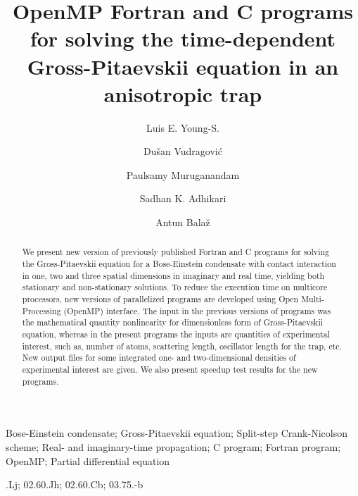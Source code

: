 \documentclass[onecolumn,3p]{elsarticle}
\begin{document}
\begin{frontmatter}

\title{OpenMP Fortran and C programs for solving the time-dependent Gross-Pitaevskii equation in an anisotropic trap}

\author[ift]{Luis E. Young-S.}

\author[scl]{Du\v{s}an Vudragovi\'{c}}

\author[bdu]{Paulsamy Muruganandam}

\author[ift]{Sadhan K. Adhikari}

\author[scl]{Antun Bala\v{z}}

\address[ift]{Instituto de F\'{\i}sica Te\'{o}rica, UNESP -- Universidade Estadual Paulista, 01.140-70 S\~{a}o Paulo, S\~{a}o Paulo, Brazil}
\address[scl]{Scientific Computing Laboratory, Institute of Physics Belgrade, University of Belgrade, Pregrevica 118, 11080 Belgrade, Serbia}
\address[bdu]{School of Physics, Bharathidasan University, Palkalaiperur Campus, Tiruchirappalli -- 620024, Tamil Nadu, India}

\begin{abstract}
We present new version of previously published Fortran and C programs for solving the Gross-Pitaevskii equation for a Bose-Einstein condensate
with contact interaction in one, two and three spatial dimensions in imaginary and real time, yielding both stationary and non-stationary solutions.
To reduce the execution time on multicore processors, new versions of parallelized programs are developed using
Open Multi-Processing (OpenMP) interface.
The input in the previous versions of programs was the mathematical quantity nonlinearity for dimensionless form of Gross-Pitaevskii equation,
whereas in the present programs the inputs are quantities of experimental interest, such as, 
number of atoms, scattering length, oscillator length for the trap, etc.
New output files for some integrated one- and two-dimensional densities of experimental interest are given.
We also present speedup test results for the new programs. 
\end{abstract}

\begin{keyword}
Bose-Einstein condensate; Gross-Pitaevskii equation; Split-step Crank-Nicolson scheme; Real- and imaginary-time propagation;
C program; Fortran program; OpenMP; Partial differential equation

.Lj; 02.60.Jh; 02.60.Cb; 03.75.-b
\end{keyword}

\end{frontmatter}
\end{document}
